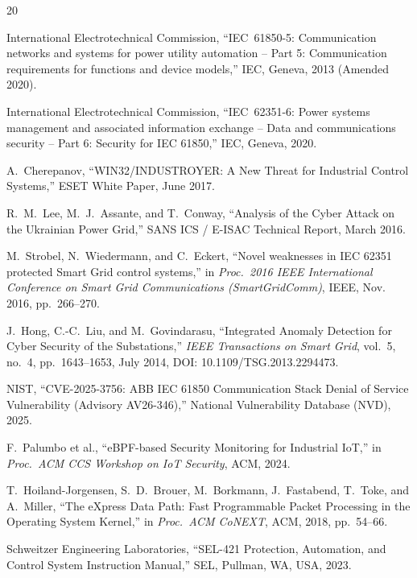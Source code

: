 \documentclass[12pt,a4paper]{article}
\begin{document}
\newpage
\begin{thebibliography}{20}

International Electrotechnical Commission, ``IEC~61850-5: Communication networks and systems for power utility automation -- Part 5: Communication requirements for functions and device models,'' IEC, Geneva, 2013 (Amended 2020).

International Electrotechnical Commission, ``IEC~62351-6: Power systems management and associated information exchange -- Data and communications security -- Part 6: Security for IEC 61850,'' IEC, Geneva, 2020.

A.~Cherepanov, ``WIN32/INDUSTROYER: A New Threat for Industrial Control Systems,'' ESET White Paper, June 2017.

R.~M.~Lee, M.~J.~Assante, and T.~Conway, ``Analysis of the Cyber Attack on the Ukrainian Power Grid,'' SANS ICS / E-ISAC Technical Report, March 2016.

M.~Strobel, N.~Wiedermann, and C.~Eckert, ``Novel weaknesses in IEC 62351 protected Smart Grid control systems,'' in \textit{Proc.\ 2016 IEEE International Conference on Smart Grid Communications (SmartGridComm)}, IEEE, Nov. 2016, pp.~266--270.

J.~Hong, C.-C.~Liu, and M.~Govindarasu, ``Integrated Anomaly Detection for Cyber Security of the Substations,'' \textit{IEEE Transactions on Smart Grid}, vol.~5, no.~4, pp.~1643--1653, July 2014, DOI: 10.1109/TSG.2013.2294473.

NIST, ``CVE-2025-3756: ABB IEC 61850 Communication Stack Denial of Service Vulnerability (Advisory AV26-346),'' National Vulnerability Database (NVD), 2025.

F.~Palumbo et al., ``eBPF-based Security Monitoring for Industrial IoT,'' in \textit{Proc.\ ACM CCS Workshop on IoT Security}, ACM, 2024.

T.~Hoiland-Jorgensen, S.~D.~Brouer, M.~Borkmann, J.~Fastabend, T.~Toke, and A.~Miller, ``The eXpress Data Path: Fast Programmable Packet Processing in the Operating System Kernel,'' in \textit{Proc.\ ACM CoNEXT}, ACM, 2018, pp.~54--66.

Schweitzer Engineering Laboratories, ``SEL-421 Protection, Automation, and Control System Instruction Manual,'' SEL, Pullman, WA, USA, 2023.

\end{thebibliography}
\end{document}
